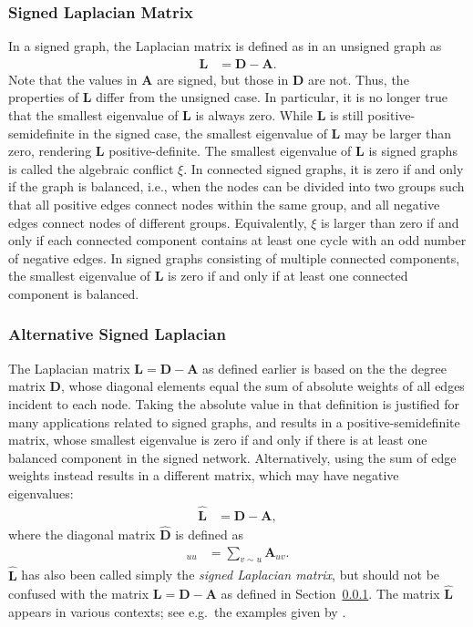 \documentclass{article}
\begin{document}
\subsubsection{Signed Laplacian Matrix}
\label{sec:decomposition:lap:signed}
In a signed graph, the Laplacian matrix is defined as in an unsigned
graph as
\begin{align*}
  \mathbf L &= \mathbf D - \mathbf A.
\end{align*}
Note that the values in $\mathbf A$ are signed, but those in $\mathbf D$
are not.  Thus, the properties of $\mathbf L$ differ from the unsigned
case.  In particular, it is no longer true that the smallest eigenvalue
of $\mathbf L$ is always zero.  While $\mathbf L$ is still
positive-semidefinite in the signed case, 
the smallest eigenvalue of $\mathbf L$ may be larger than zero,
rendering $\mathbf L$ positive-definite. 
The smallest eigenvalue of $\mathbf L$ is signed graphs is called 
the algebraic conflict $\xi$.  In connected signed graphs, it is zero if and only if the graph is balanced,
i.e., when the nodes can be divided into two groups such that all
positive edges connect nodes within the same group, and all negative
edges connect nodes of different groups.  Equivalently, $\xi$ is larger
than zero if and only if each connected component contains at least one
cycle with an odd number of negative edges. 
In signed graphs consisting of multiple connected components, the
smallest eigenvalue of $\mathbf L$ is zero if and only if at least one
connected component is balanced.  

\subsubsection{Alternative Signed Laplacian}
The Laplacian matrix $\mathbf L = \mathbf D - \mathbf A$ as defined
earlier is based on the the degree matrix $\mathbf D$, whose diagonal
elements equal the sum of absolute weights of all edges incident to each
node.  
Taking the absolute value in that definition is justified for
many applications related to signed graphs, and results in a positive-semidefinite matrix, whose
smallest eigenvalue is zero if and only if there is at least one
balanced component in the signed network.  Alternatively, using the sum
of edge weights instead results in a different matrix, which may have
negative eigenvalues:
\begin{align*}
  \mathbf{\hat L} &= \mathbf{\hat D} - \mathbf A,
\end{align*}
where the diagonal matrix $\mathbf{\hat D}$ is defined as
\begin{align*}
  [\mathbf{\hat D}]_{uu} &= \sum_{v \sim u} \mathbf A_{uv}.
\end{align*}
$\mathbf{\hat L}$ has also been called simply the \emph{signed Laplacian
  matrix}, but should not be confused with the matrix $\mathbf L =
\mathbf D - \mathbf A$ as defined in
Section~\ref{sec:decomposition:lap:signed}. 
The matrix $\mathbf{\hat L}$ appears in various contexts; see e.g.\ the
examples given by \cite{b875}.  
\end{document}
